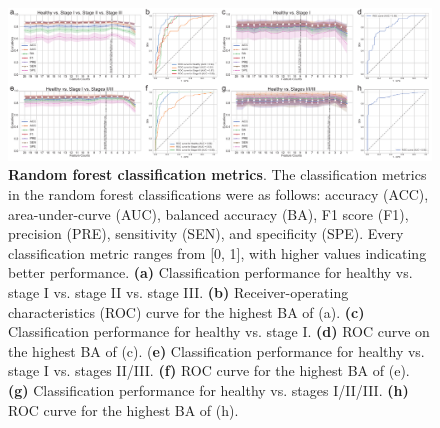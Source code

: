 \documentclass[11pt, a4paper, onecolumn, oneside]{report}
\begin{document}
            \begin{figure}[p]
                \centering
                \includegraphics[width=15 cm]{Figures/Periodontitis/Figure_4.pdf}
                \caption[Random forest classification metrics]{\textbf{Random forest classification metrics}. The classification metrics in the random forest classifications were as follows: accuracy (ACC), area-under-curve (AUC), balanced accuracy (BA), F1 score (F1), precision (PRE), sensitivity (SEN), and specificity (SPE). Every classification metric ranges from [0, 1], with higher values indicating better performance. \textbf{(a)} Classification performance for healthy vs. stage I vs. stage II vs. stage III. \textbf{(b)} Receiver-operating characteristics (ROC) curve for the highest BA of (a). \textbf{(c)} Classification performance for healthy vs. stage I. \textbf{(d)} ROC curve on the highest BA of (c). (\textbf{e)} Classification performance for healthy vs. stage I vs. stages II/III. \textbf{(f)} ROC curve for the highest BA of (e). \textbf{(g)} Classification performance for healthy vs. stages I/II/III. \textbf{(h)} ROC curve for the highest BA of (h).}
                \label{fig:Periodontitis-ML}
            \end{figure}
            \clearpage
\end{document}
